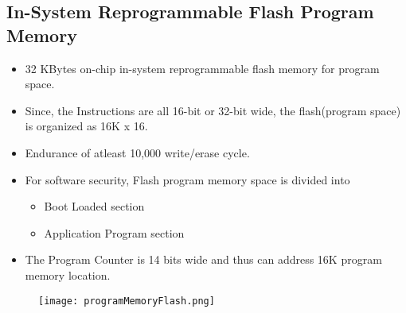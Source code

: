 \documentclass{article}
\begin{document}
\subsection{In-System Reprogrammable Flash Program Memory}
\begin{itemize}
    \item 32 KBytes on-chip in-system reprogrammable flash memory for program space.
    \item Since, the Instructions are all 16-bit or  32-bit wide, the flash(program space) is organized as 16K x 16.
    \item Endurance of atleast 10,000 write/erase cycle.
    \item For software security, Flash program memory space is divided into
          \begin{itemize}
              \item Boot Loaded section
              \item Application Program section
          \end{itemize}
    \item The Program Counter is 14 bits wide and thus can address 16K program memory location.\end{itemize}

\begin{figure}[H]
    \begin{center}
        \texttt{[image: programMemoryFlash.png]}
    \end{center}
\end{figure}
\end{document}
